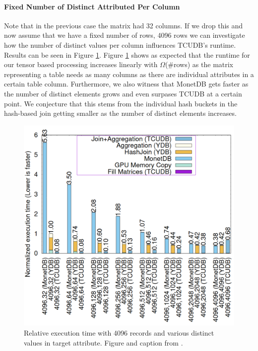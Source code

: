 \documentclass{paper}
\begin{document}
\paragraph{Fixed Number of Distinct Attributed Per Column}
Note that in the previous case the matrix had 32 columns. If we drop this and now assume that we have a fixed number of rows, 4096 rows we can investigate how the number of distinct values per column influences TCUDB's runtime. Results can be seen in Figure \ref{fig:bench2}. Figure \ref{fig:bench2} shows as expected that the runtime for our tensor based processing increases linearly with $\Omega$(\#rows) as the matrix representing a table needs as many columns as there are individual attributes in a certain table column. Furthermore, we also witness that MonetDB gets faster as the number of distinct elements grows and even surpases TCUDB at a certain point. We conjecture that this stems from the individual hash buckets in the hash-based join getting smaller as the number of distinct elements increases.

		\begin{figure}
		\centering
		\includegraphics[width=0.9\linewidth]{bench2}
		\caption{Relative execution time with 4096 records and various distinct values in target attribute. Figure and caption from \cite{hu2021tcudb}.}
		\label{fig:bench2}
	\end{figure}
	
\end{document}
